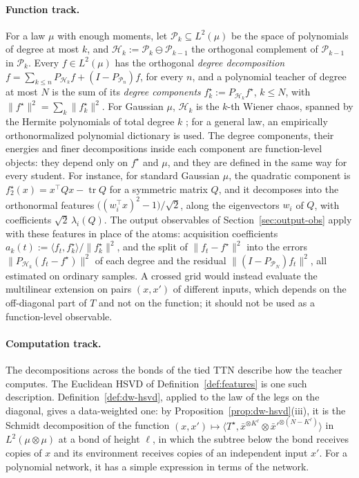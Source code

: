 \documentclass[11pt]{article}
\newcommand{\norm}[1]{\lVert #1\rVert}
\newcommand{\xb}{\bar{x}}
\theoremstyle{definition}
\numberwithin{equation}{section}
\begin{document}
\paragraph{Function track.}
For a law $\mu$ with enough moments, let $\mathcal P_k\subseteq L^2(\mu)$ be the space of polynomials of degree at most $k$, and $\mathcal H_k:=\mathcal P_k\ominus\mathcal P_{k-1}$ the orthogonal complement of $\mathcal P_{k-1}$ in $\mathcal P_k$. Every $f\in L^2(\mu)$ has the orthogonal \emph{degree decomposition} $f=\sum_{k\le n}P_{\mathcal H_k}f+(I-P_{\mathcal P_n})f$, for every $n$, and a polynomial teacher of degree at most $N$ is the sum of its \emph{degree components} $f^\star_k:=P_{\mathcal H_k}f^\star$, $k\le N$, with $\norm{f^\star}^2=\sum_k\norm{f^\star_k}^2$. For Gaussian $\mu$, $\mathcal H_k$ is the $k$-th Wiener chaos, spanned by the Hermite polynomials of total degree $k$ \citep{janson1997gaussian}; for a general law, an empirically orthonormalized polynomial dictionary is used. The degree components, their energies and finer decompositions inside each component are function-level objects: they depend only on $f^\star$ and $\mu$, and they are defined in the same way for every student. For instance, for standard Gaussian $\mu$, the quadratic component is $f^\star_2(x)=x^\top Qx-\operatorname{tr}Q$ for a symmetric matrix $Q$, and it decomposes into the orthonormal features $\big((w_i^\top x)^2-1\big)/\sqrt2$, along the eigenvectors $w_i$ of $Q$, with coefficients $\sqrt2\,\lambda_i(Q)$. The output observables of Section~\ref{sec:output-obs} apply with these features in place of the atoms: acquisition coefficients $a_k(t):=\langle f_t,f^\star_k\rangle/\norm{f^\star_k}^2$, and the split of $\norm{f_t-f^\star}^2$ into the errors $\norm{P_{\mathcal H_k}(f_t-f^\star)}^2$ of each degree and the residual $\norm{(I-P_{\mathcal P_N})f_t}^2$, all estimated on ordinary samples. A crossed grid would instead evaluate the multilinear extension on pairs $(x,x')$ of different inputs, which depends on the off-diagonal part of $T$ and not on the function; it should not be used as a function-level observable.

\paragraph{Computation track.}
The decompositions across the bonds of the tied TTN describe how the teacher computes. The Euclidean HSVD of Definition~\ref{def:features} is one such description. Definition~\ref{def:dw-hsvd}, applied to the law of the legs on the diagonal, gives a data-weighted one: by Proposition~\ref{prop:dw-hsvd}(iii), it is the Schmidt decomposition of the function $(x,x')\mapsto\langle T^\star,\xb^{\otimes K^\ell}\otimes\xb'^{\otimes(N-K^\ell)}\rangle$ in $L^2(\mu\otimes\mu)$ at a bond of height $\ell$, in which the subtree below the bond receives copies of $x$ and its environment receives copies of an independent input $x'$. For a polynomial network, it has a simple expression in terms of the network.
\end{document}
